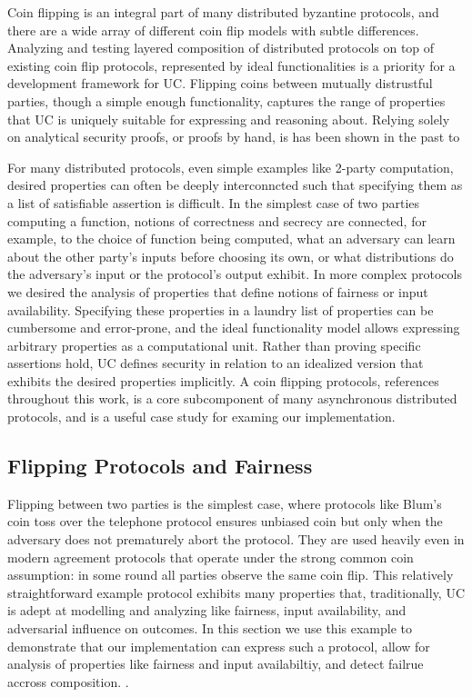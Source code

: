 Coin flipping is an integral part of many distributed byzantine protocols, and there are a wide array of different coin flip models with subtle differences. 
Analyzing and testing layered composition of distributed protocols on top of existing coin flip protocols, represented by ideal functionalities is a priority for a development framework for UC.
Flipping coins between mutually distrustful parties, though a simple enough functionality, captures the range of properties that UC is uniquely suitable for expressing and reasoning about. 
Relying solely on analytical security proofs, or proofs by hand, is has been shown in the past to 


For many distributed protocols, even simple examples like 2-party computation, desired properties can often be deeply interconncted such that specifying them as a list of satisfiable assertion is difficult. 
In the simplest case of two parties computing a function, notions of correctness and secrecy are connected, for example, to the choice of function being computed, what an adversary can learn about the other party's inputs before choosing its own, or what distributions do the adversary's input or the protocol's output exhibit. 
In more complex protocols we desired the analysis of properties that define notions of fairness or input availability.
Specifying these properties in a laundry list of properties can be cumbersome and error-prone, and the ideal functionality model allows expressing arbitrary properties as a computational unit.
Rather than proving specific assertions hold, UC defines security in relation to an idealized version that exhibits the desired properties implicitly.
A coin flipping protocols, references throughout this work, is a core subcomponent of many asynchronous distributed protocols, and is a useful case study for examing our implementation.

\subsection{Flipping Protocols and Fairness}
Flipping between two parties is the simplest case, where protocols like Blum's coin toss over the telephone protocol ensures unbiased coin but only when the adversary does not prematurely abort the protocol.
They are used heavily even in modern agreement protocols that operate under the strong common coin assumption: in some round all parties observe the same coin flip. 
This relatively straightforward example protocol exhibits many properties that, traditionally, UC is adept at modelling and analyzing like fairness, input availability, and adversarial influence on outcomes.
In this section we use this example to demonstrate that our implementation can express such a protocol, allow for analysis of properties like fairness and input availabiltiy, and detect failrue accross composition. .

